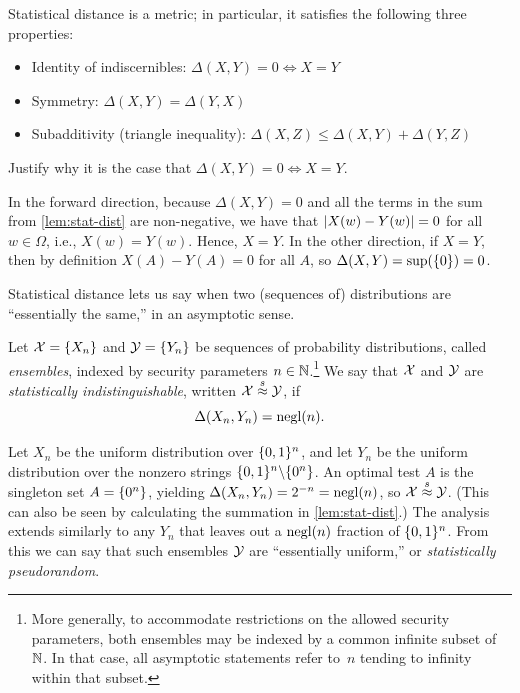 \documentclass[11pt]{article}
\begin{document}
\begin{lemma}
  Statistical distance is a metric; in particular, it satisfies the
  following three properties:
  \begin{itemize}[itemsep=0pt]
  \item Identity of indiscernibles: $\Delta(X,Y) = 0 \iff X = Y$
  \item Symmetry: $\Delta(X,Y) = \Delta(Y,X)$
  \item Subadditivity (triangle inequality):
    $\Delta(X,Z) \leq \Delta(X,Y) + \Delta(Y, Z)$
  \end{itemize}
\end{lemma}

\begin{question}
  Justify why it is the case that $\Delta(X,Y) = 0 \iff X = Y$.
\end{question}

\begin{answer}
  In the forward direction, because $\Delta(X,Y) = 0$ and all the
  terms in the sum from \cref{lem:stat-dist} are non-negative,
  we have that $\lvert X(w) - Y(w)\rvert = 0$ for all $w \in \Omega$, i.e.,
  $X(w) = Y(w)$. Hence, $X = Y$. In the other direction, if $X = Y$,
  then by definition $X(A) - Y(A) = 0$ for all $A$, so
  $\Delta(X,Y) = \sup(\{0\}) = 0$.
\end{answer}

Statistical distance lets us say when two (sequences of) distributions
are ``essentially the same,'' in an asymptotic sense.

\begin{definition}
  \label{def:stat-ind}
  Let $\mathcal{X} = \{X_{n}\}$ and $\mathcal{Y} = \{Y_{n}\}$ be sequences of probability distributions, called \emph{ensembles}, indexed by security parameters $n\in\mathbb{N}$.\footnote{More generally, to accommodate restrictions on the allowed security parameters, both ensembles may be indexed by a common infinite subset of~$\mathbb{N}$.
    In that case, all asymptotic statements refer to~$n$ tending to infinity within that subset.}
  We say that $\mathcal{X}$ and $\mathcal{Y}$ are \emph{statistically indistinguishable}, written $\mathcal{X} \stackrel{s}{\approx} \mathcal{Y}$, if \[ \Delta(X_{n}, Y_{n}) = \operatorname{negl}(n)\text. \]
\end{definition}

\begin{example}
  Let $X_{n}$ be the uniform distribution over $\{0,1\}^{n}$, and let
  $Y_{n}$ be the uniform distribution over the nonzero strings
  $\{0,1\}^{n} \backslash \{0^{n}\}$.  An optimal test $A$ is the
  singleton set $A = \{0^{n}\}$, yielding
  $\Delta(X_{n}, Y_{n}) = 2^{-n} = \operatorname{negl}(n)$, so
  $\mathcal{X} \stackrel{s}{\approx} \mathcal{Y}$.  (This can also be seen by calculating the
  summation in \cref{lem:stat-dist}.)  The analysis extends
  similarly to any $Y_{n}$ that leaves out a $\operatorname{negl}(n)$ fraction of
  $\{0,1\}^{n}$.  From this we can say that such ensembles $\mathcal{Y}$ are
  ``essentially uniform,'' or \emph{statistically pseudorandom}.
\end{example}
\end{document}
